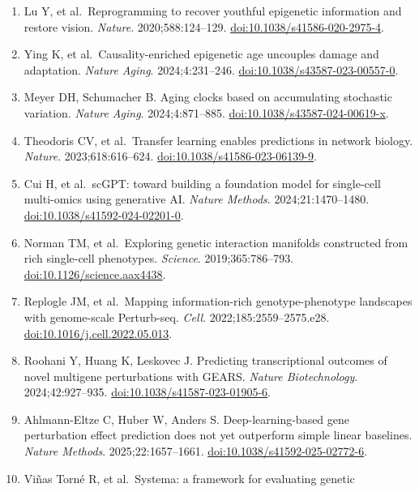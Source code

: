 \documentclass[
  11pt,
  letterpaper,
]{article}
\begin{document}
\begin{enumerate}
  \href{https://doi.org/10.1016/j.cell.2016.11.052}{doi:10.1016/j.cell.2016.11.052}.
\item
  Lu Y, et al.~Reprogramming to recover youthful epigenetic information
  and restore vision. \emph{Nature}. 2020;588:124--129.
  \href{https://doi.org/10.1038/s41586-020-2975-4}{doi:10.1038/s41586-020-2975-4}.
\item
  Ying K, et al.~Causality-enriched epigenetic age uncouples damage and
  adaptation. \emph{Nature Aging}. 2024;4:231--246.
  \href{https://doi.org/10.1038/s43587-023-00557-0}{doi:10.1038/s43587-023-00557-0}.
\item
  Meyer DH, Schumacher B. Aging clocks based on accumulating stochastic
  variation. \emph{Nature Aging}. 2024;4:871--885.
  \href{https://doi.org/10.1038/s43587-024-00619-x}{doi:10.1038/s43587-024-00619-x}.
\item
  Theodoris CV, et al.~Transfer learning enables predictions in network
  biology. \emph{Nature}. 2023;618:616--624.
  \href{https://doi.org/10.1038/s41586-023-06139-9}{doi:10.1038/s41586-023-06139-9}.
\item
  Cui H, et al.~scGPT: toward building a foundation model for
  single-cell multi-omics using generative AI. \emph{Nature Methods}.
  2024;21:1470--1480.
  \href{https://doi.org/10.1038/s41592-024-02201-0}{doi:10.1038/s41592-024-02201-0}.
\item
  Norman TM, et al.~Exploring genetic interaction manifolds constructed
  from rich single-cell phenotypes. \emph{Science}. 2019;365:786--793.
  \href{https://doi.org/10.1126/science.aax4438}{doi:10.1126/science.aax4438}.
\item
  Replogle JM, et al.~Mapping information-rich genotype-phenotype
  landscapes with genome-scale Perturb-seq. \emph{Cell}.
  2022;185:2559--2575.e28.
  \href{https://doi.org/10.1016/j.cell.2022.05.013}{doi:10.1016/j.cell.2022.05.013}.
\item
  Roohani Y, Huang K, Leskovec J. Predicting transcriptional outcomes of
  novel multigene perturbations with GEARS. \emph{Nature Biotechnology}.
  2024;42:927--935.
  \href{https://doi.org/10.1038/s41587-023-01905-6}{doi:10.1038/s41587-023-01905-6}.
\item
  Ahlmann-Eltze C, Huber W, Anders S. Deep-learning-based gene
  perturbation effect prediction does not yet outperform simple linear
  baselines. \emph{Nature Methods}. 2025;22:1657--1661.
  \href{https://doi.org/10.1038/s41592-025-02772-6}{doi:10.1038/s41592-025-02772-6}.
\item
  Viñas Torné R, et al.~Systema: a framework for evaluating genetic

\end{enumerate}
\end{document}
